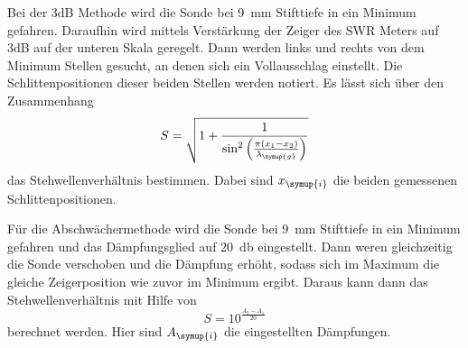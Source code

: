 Bei der 3dB Methode wird die Sonde bei \SI{9}{\milli\meter} Stifttiefe in ein
Minimum gefahren. Daraufhin wird mittels Verstärkung der Zeiger des SWR Meters auf
3dB auf der unteren Skala geregelt. Dann werden links und rechts von dem Minimum
Stellen gesucht, an denen sich ein Vollausschlag einstellt. Die Schlittenpositionen
dieser beiden Stellen werden notiert. Es lässt sich über den Zusammenhang
\begin{equation}
  S=\sqrt{1+\frac{1}{\sin^2\left(\frac{\pi(x_1-x_2)}{\lambda_{\symup{g}}}\right)}}
  \label{eqn:3dB}
\end{equation}
das Stehwellenverhältnis bestimmen. Dabei sind $x_{\symup{i}}$ die beiden gemessenen
Schlittenpositionen.

Für die Abschwächermethode wird die Sonde bei \SI{9}{\milli\meter} Stifttiefe in ein
Minimum gefahren und das Dämpfungsglied auf \SI{20}{\decibel} eingestellt. Dann
weren gleichzeitig die Sonde verschoben und die Dämpfung erhöht, sodass sich im
Maximum die gleiche Zeigerposition wie zuvor im Minimum ergibt. Daraus kann dann
das Stehwellenverhältnis mit Hilfe von
\begin{equation}
  S=10^{\frac{A_2-A_1}{20}}
  \label{eqn:abschwaecher}
\end{equation}
berechnet werden. Hier sind $A_{\symup{i}}$ die eingestellten Dämpfungen.
